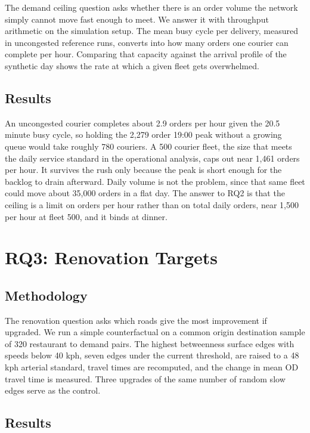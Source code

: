 \documentclass[
  11pt,
]{article}
\begin{document}
The demand ceiling question asks whether there is an order volume the
network simply cannot move fast enough to meet. We answer it with
throughput arithmetic on the simulation setup. The mean busy cycle per
delivery, measured in uncongested reference runs, converts into how many
orders one courier can complete per hour. Comparing that capacity
against the arrival profile of the synthetic day shows the rate at which
a given fleet gets overwhelmed.

\subsection{Results}\label{results-1}

An uncongested courier completes about 2.9 orders per hour given the
20.5 minute busy cycle, so holding the 2,279 order 19:00 peak without a
growing queue would take roughly 780 couriers. A 500 courier fleet, the
size that meets the daily service standard in the operational analysis,
caps out near 1,461 orders per hour. It survives the rush only because
the peak is short enough for the backlog to drain afterward. Daily
volume is not the problem, since that same fleet could move about 35,000
orders in a flat day. The answer to RQ2 is that the ceiling is a limit
on orders per hour rather than on total daily orders, near 1,500 per
hour at fleet 500, and it binds at dinner.

\section{RQ3: Renovation Targets}\label{rq3-renovation-targets}

\subsection{Methodology}\label{methodology-2}

The renovation question asks which roads give the most improvement if
upgraded. We run a simple counterfactual on a common origin destination
sample of 320 restaurant to demand pairs. The highest betweenness
surface edges with speeds below 40 kph, seven edges under the current
threshold, are raised to a 48 kph arterial standard, travel times are
recomputed, and the change in mean OD travel time is measured. Three
upgrades of the same number of random slow edges serve as the control.

\subsection{Results}\label{results-2}
\end{document}
